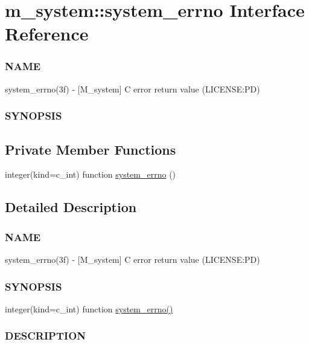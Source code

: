 \hypertarget{interfacem__system_1_1system__errno}{}\section{m\+\_\+system\+:\+:system\+\_\+errno Interface Reference}
\label{interfacem__system_1_1system__errno}


\subsubsection*{N\+A\+ME}

system\+\_\+errno(3f) -\/ \mbox{[}M\+\_\+system\mbox{]} C error return value (L\+I\+C\+E\+N\+SE\+:PD) \subsubsection*{S\+Y\+N\+O\+P\+S\+IS} 


\subsection*{Private Member Functions}
\begin{DoxyCompactItemize}
\item 
integer(kind=c\+\_\+int) function \mbox{\hyperlink{interfacem__system_1_1system__errno_a6450910dca7e89b71a84745d95a52d79}{system\+\_\+errno}} ()
\end{DoxyCompactItemize}


\subsection{Detailed Description}
\subsubsection*{N\+A\+ME}

system\+\_\+errno(3f) -\/ \mbox{[}M\+\_\+system\mbox{]} C error return value (L\+I\+C\+E\+N\+SE\+:PD) \subsubsection*{S\+Y\+N\+O\+P\+S\+IS}

integer(kind=c\+\_\+int) function \mbox{\hyperlink{interfacem__system_1_1system__errno_a6450910dca7e89b71a84745d95a52d79}{system\+\_\+errno()}}

\subsubsection*{D\+E\+S\+C\+R\+I\+P\+T\+I\+ON}

